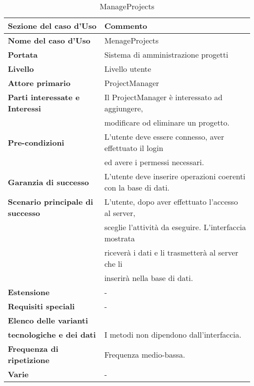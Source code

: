 \documentclass[12pt]{scrartcl}
\begin{document}
\begin{table}[h!]
  \caption{ManageProjects}
  \label{tab:table5}
  \begin{tabular}{|l|l|}
    \toprule
    \textbf{Sezione del caso d'Uso} & \textbf{Commento}\\
    \midrule
    \textbf{Nome del caso d'Uso} & MenageProjects\\
    \midrule
    \textbf{Portata} & Sistema di amministrazione progetti\\
    \midrule
    \textbf{Livello} & Livello utente\\
    \midrule
    \textbf{Attore primario} & ProjectManager\\
    \midrule
    \textbf{Parti interessate e Interessi} & Il ProjectManager \`e interessato ad aggiungere,
    \\& modificare od eliminare un progetto.\\
    \midrule
    \textbf{Pre-condizioni} & L'utente deve essere connesso, aver effettuato il login
    \\& ed avere i permessi necessari.\\
    \midrule
    \textbf{Garanzia di successo} & L'utente deve inserire operazioni coerenti con la base di dati.\\
    \midrule
    \textbf{Scenario principale di successo} & L'utente, dopo aver effettuato l'accesso al server,
    \\& sceglie l'attivit\`a da eseguire. L'interfaccia mostrata
    \\& ricever\`a i dati e li trasmetter\`a al server che li 
    \\& inserir\`a nella base di dati.\\
    \midrule
    \textbf{Estensione} & - \\
    \midrule
    \textbf{Requisiti speciali} & - \\
    \midrule
    \textbf{Elenco delle varianti}\\ \textbf{tecnologiche e dei dati} & I metodi non dipendono dall'interfaccia.\\
    \midrule
    \textbf{Frequenza di ripetizione} & Frequenza medio-bassa.\\
    \textbf{Varie} & - \\
    \bottomrule
  \end{tabular}
\end{table}
\end{document}
